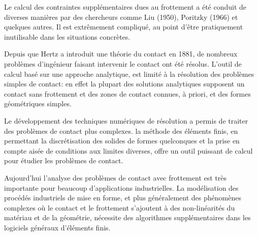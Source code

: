\begin{histoire}
\medskip
{}

\medskip
Le calcul des contraintes supplémentaires dues au frottement a été conduit de diverses manières par des chercheurs comme Liu (1950), Poritzky (1966) et quelques autres. Il est extrêmement compliqué, au point d'être pratiquement inutilisable dans les situations concrètes.
\end{histoire}

\medskip
Depuis que Hertz a introduit une théorie du contact en 1881, de nombreux problèmes d'ingénieur faisant intervenir le contact ont été résolus. L'outil de calcul basé sur une approche analytique, est limité à la résolution des problèmes simples de contact: en effet la plupart des solutions analytiques supposent un contact sans frottement et des zones de contact connues, à priori, et des formes géométriques simples.

Le développement des techniques numériques de résolution a permis de traiter des
problèmes de contact plus complexes. la méthode des éléments finis, en permettant la discrétisation des solides de formes quelconques et la prise en compte aisée de conditions aux limites diverses, offre un outil puissant de calcul pour étudier les problèmes de contact.

\medskip
Aujourd'hui l'analyse des problèmes de contact avec frottement est très importante pour beaucoup d'applications industrielles. La modélisation des procédés industriels de mise en forme, et plus généralement des phénomènes complexes où le contact et le frottement s'ajoutent à des non-linéarités du matériau et de la géométrie, nécessite des algorithmes supplémentaires dans les logiciels généraux d'éléments finis.

